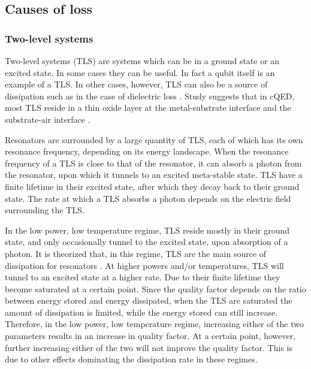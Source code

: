 \documentclass[12pt]{report}
\begin{document}
\subsection{Causes of loss}

\subsubsection{Two-level systems}
\label{sec:TLS}

Two-level systems (TLS) are systems which can be in a ground state or an excited state. In some cases they can be useful. In fact a qubit itself is an example of a TLS. In other cases, however, TLS can also be a source of dissipation such as in the case of dielectric loss \cite{martinis2014ucsb}. Study suggests that in cQED, most TLS reside in a thin oxide layer at the metal-substrate interface and the substrate-air interface \cite{wenner2011surface}.

Resonators are surrounded by a large quantity of TLS, each of which has its own resonance frequency, depending on its energy landscape. When the resonance frequency of a TLS is close to that of the resonator, it can absorb a photon from the resonator, upon which it tunnels to an excited meta-stable state. TLS have a finite lifetime in their excited state, after which they decay back to their ground state. The rate at which a TLS absorbs a photon depends on the electric field surrounding the TLS.

In the low power, low temperature regime, TLS reside mostly in their ground state, and only occasionally tunnel to the excited state, upon absorption of a photon. It is theorized that, in this regime, TLS are the main source of dissipation for resonators \cite{gao2008experimental}. At higher powers and/or temperatures, TLS will tunnel to an excited state at a higher rate. Due to their finite lifetime they become saturated at a certain point. Since the quality factor depends on the ratio between energy stored and energy dissipated, when the TLS are saturated the amount of dissipation is limited, while the energy stored can still increase. Therefore, in the low power, low temperature regime, increasing either of the two parameters results in an increase in quality factor. At a certain point, however, further increasing either of the two will not improve the quality factor. This is due to other effects dominating the dissipation rate in these regimes.

\end{document}
